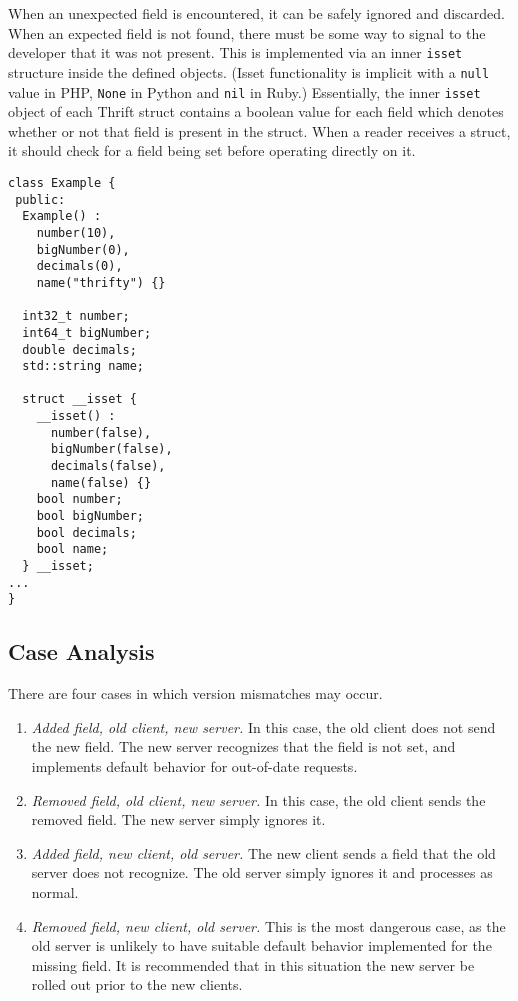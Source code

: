 \documentclass[nocopyrightspace,blockstyle]{sigplanconf}
\begin{document}
When an unexpected field is encountered, it can be safely ignored and
discarded. When an expected field is not found, there must be some way to
signal to the developer that it was not present. This is implemented via an
inner \texttt{isset} structure inside the defined objects. (Isset functionality
is implicit with a \texttt{null} value in PHP, \texttt{None} in Python
and \texttt{nil} in Ruby.) Essentially,
the inner \texttt{isset} object of each Thrift struct contains a boolean value
for each field which denotes whether or not that field is present in the
struct. When a reader receives a struct, it should check for a field being set
before operating directly on it.

\begin{verbatim}
class Example {
 public:
  Example() :
    number(10),
    bigNumber(0),
    decimals(0),
    name("thrifty") {} 

  int32_t number;
  int64_t bigNumber;
  double decimals;
  std::string name;

  struct __isset {
    __isset() :
      number(false),
      bigNumber(false),
      decimals(false),
      name(false) {}
    bool number;
    bool bigNumber;
    bool decimals;
    bool name;
  } __isset;
...
}
\end{verbatim} 

\subsection{Case Analysis}

There are four cases in which version mismatches may occur.

\begin{enumerate}
\item \textit{Added field, old client, new server.} In this case, the old
client does not send the new field. The new server recognizes that the field
is not set, and implements default behavior for out-of-date requests.
\item \textit{Removed field, old client, new server.} In this case, the old
client sends the removed field. The new server simply ignores it.
\item \textit{Added field, new client, old server.} The new client sends a
field that the old server does not recognize. The old server simply ignores
it and processes as normal.
\item \textit{Removed field, new client, old server.} This is the most
dangerous case, as the old server is unlikely to have suitable default
behavior implemented for the missing field. It is recommended that in this
situation the new server be rolled out prior to the new clients.
\end{enumerate}
\end{document}
